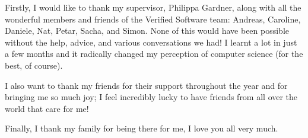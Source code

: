 Firstly, I would like to thank my supervisor, Philippa Gardner, along with all the wonderful members and friends of the Verified Software team: Andreas, Caroline, Daniele, Nat, Petar, Sacha, and Simon. None of this would have been possible without the help, advice, and various conversations we had! I learnt a lot in just a few months and it radically changed my perception of computer science (for the best, of course).

I also want to thank my friends for their support throughout the year and for bringing me so much joy; I feel incredibly lucky to have friends from all over the world that care for me!

Finally, I thank my family for being there for me, I love you all very much.
